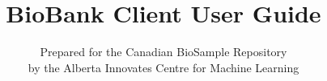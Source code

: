 \documentclass[10pt,twoside,letterpaper]{book}
\begin{document}
\frontmatter

\title{BioBank Client User Guide}
\author{\Large{Prepared for the Canadian BioSample Repository}\\
by the Alberta Innovates Centre for Machine Learning}
\maketitle
\clearpage
\tableofcontents
\clearpage
\listoffigures
\clearpage
\listoftodos
\clearpage

\mainmatter









\backmatter
\end{document}
